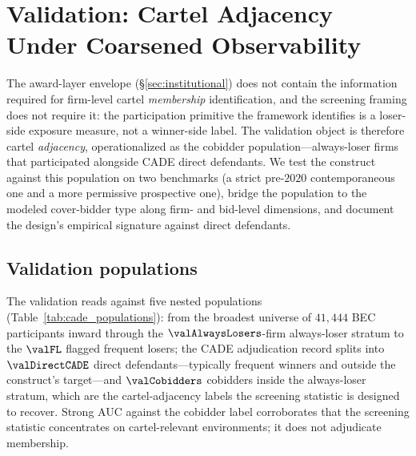 \section{Validation: Cartel Adjacency Under Coarsened Observability}
\label{sec:cade}

The award-layer envelope (\S\ref{sec:institutional}) does not
contain the information required for firm-level cartel
\emph{membership} identification, and the screening framing does
not require it: the participation primitive the framework
identifies is a loser-side exposure measure, not a winner-side
label. The validation object is therefore cartel \emph{adjacency},
operationalized as the cobidder population---always-loser firms
that participated alongside CADE direct defendants. We test the
construct against this population on two benchmarks (a strict
pre-$2020$ contemporaneous one and a more permissive prospective
one), bridge the population to the modeled cover-bidder type
along firm- and bid-level dimensions, and document the design's
empirical signature against direct defendants.

\subsection{Validation populations}
\label{sec:cade_objects}

The validation reads against five nested populations
(Table~\ref{tab:cade_populations}): from the broadest universe
of $41{,}444$ BEC participants inward through the
$\valAlwaysLosers$-firm always-loser stratum to the $\valFL$
flagged frequent losers; the CADE adjudication record splits
into $\valDirectCADE$ direct defendants---typically frequent
winners and outside the construct's target---and $\valCobidders$
cobidders inside the always-loser stratum, which are the
cartel-adjacency labels the screening statistic is designed to
recover. Strong AUC against the cobidder label corroborates that
the screening statistic concentrates on cartel-relevant
environments; it does not adjudicate membership.

